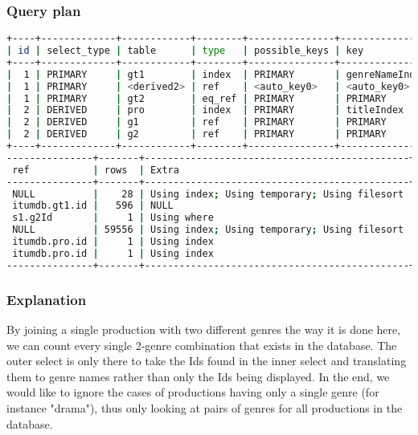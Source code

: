 \subsubsection{Query plan}
\begin{lstlisting}[language=bash]
+----+-------------+------------+--------+---------------+----------------+---------+
| id | select_type | table      | type   | possible_keys | key            | key_len |
+----+-------------+------------+--------+---------------+----------------+---------+
|  1 | PRIMARY     | gt1        | index  | PRIMARY       | genreNameIndex | 77      |
|  1 | PRIMARY     | <derived2> | ref    | <auto_key0>   | <auto_key0>    | 4       |
|  1 | PRIMARY     | gt2        | eq_ref | PRIMARY       | PRIMARY        | 4       |
|  2 | DERIVED     | pro        | index  | PRIMARY       | titleIndex     | 32      |
|  2 | DERIVED     | g1         | ref    | PRIMARY       | PRIMARY        | 4       |
|  2 | DERIVED     | g2         | ref    | PRIMARY       | PRIMARY        | 4       |
+----+-------------+------------+--------+---------------+----------------+---------+
---------------+-------+----------------------------------------------+
 ref           | rows  | Extra                                        |
---------------+-------+----------------------------------------------+
 NULL          |    28 | Using index; Using temporary; Using filesort |
 itumdb.gt1.id |   596 | NULL                                         |
 s1.g2Id       |     1 | Using where                                  |
 NULL          | 59556 | Using index; Using temporary; Using filesort |
 itumdb.pro.id |     1 | Using index                                  |
 itumdb.pro.id |     1 | Using index                                  |
---------------+-------+----------------------------------------------+
\end{lstlisting}

\subsubsection{Explanation}
By joining a single production with two different genres the way it is done here, we can count every single 2-genre combination that exists in the database. The outer select is only there to take the Ids found in the inner select and translating them to genre names rather than only the Ids being displayed. In the end, we would like to ignore the cases of productions having only a single genre (for instance "drama"), thus only looking at pairs of genres for all productions in the database.